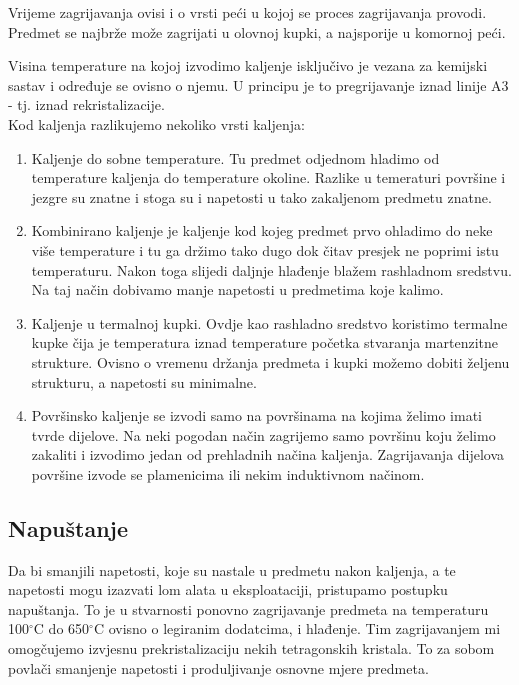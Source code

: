 \documentclass[a4paper,12pt]{article}
\numberwithin{figure}{section}
\begin{document}
Vrijeme zagrijavanja ovisi i o vrsti peći u kojoj se proces zagrijavanja provodi. Predmet se najbrže može zagrijati u olovnoj kupki, a najsporije u komornoj peći.\par
Visina temperature na kojoj izvodimo kaljenje isključivo je vezana za kemijski sastav i određuje se ovisno o njemu. U principu je to pregrijavanje iznad linije A3 - tj. iznad rekristalizacije.\\
Kod kaljenja razlikujemo nekoliko vrsti kaljenja:
\begin{enumerate}
\item Kaljenje do sobne temperature. Tu predmet odjednom hladimo od temperature kaljenja do temperature okoline. Razlike u temeraturi površine i jezgre su znatne i stoga su i napetosti u tako zakaljenom predmetu znatne.
\item Kombinirano kaljenje je kaljenje kod kojeg predmet prvo ohladimo do neke više temperature i tu ga držimo tako dugo dok čitav presjek ne poprimi istu temperaturu. Nakon toga slijedi daljnje hlađenje blažem rashladnom sredstvu. Na taj način dobivamo manje napetosti u predmetima koje kalimo.
\item Kaljenje  u termalnoj kupki. Ovdje kao rashladno sredstvo koristimo termalne kupke čija je temperatura iznad temperature početka stvaranja martenzitne strukture. Ovisno o vremenu držanja predmeta i kupki možemo dobiti željenu strukturu, a napetosti su minimalne.
\item Površinsko kaljenje se izvodi samo na površinama na kojima želimo imati tvrde dijelove. Na neki pogodan način zagrijemo samo površinu koju želimo zakaliti i izvodimo jedan od prehladnih načina kaljenja. Zagrijavanja dijelova površine izvode se plamenicima ili nekim induktivnom načinom.
\end{enumerate}
\subsection{Napuštanje}
Da bi smanjili napetosti, koje su nastale u predmetu nakon kaljenja, a te napetosti mogu izazvati lom alata u eksploataciji, pristupamo postupku napuštanja. To je u stvarnosti ponovno zagrijavanje predmeta na temperaturu 100$^{\circ}$C do 650$^{\circ}$C ovisno o legiranim dodatcima, i hlađenje. Tim zagrijavanjem mi omogčujemo izvjesnu prekristalizaciju nekih tetragonskih kristala. To za sobom povlači smanjenje napetosti i produljivanje osnovne mjere predmeta.
\end{document}
